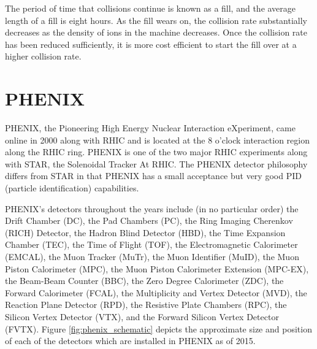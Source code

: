 The period of time that collisions continue is known as a fill, and the average length of a fill is eight hours. As the fill wears on, the collision rate substantially decreases as the density of ions in the machine decreases. Once the collision rate has been reduced sufficiently, it is more cost efficient to start the fill over at a higher collision rate.  


\section{PHENIX}
PHENIX, the Pioneering High Energy Nuclear Interaction eXperiment, came online in 2000 along with RHIC and is located at the 8 o'clock interaction region along the RHIC ring. PHENIX is one of the two major RHIC experiments along with STAR, the Solenoidal Tracker At RHIC. The PHENIX detector philosophy differs from STAR in that PHENIX has a small acceptance but very good PID (particle identification) capabilities. 

PHENIX's detectors throughout the years include (in no particular order) the Drift Chamber (DC), the Pad Chambers (PC), the Ring Imaging Cherenkov (RICH) Detector, the Hadron Blind Detector (HBD), the Time Expansion Chamber (TEC), the Time of Flight (TOF), the Electromagnetic Calorimeter (EMCAL), the Muon Tracker (MuTr), the Muon Identifier (MuID), the Muon Piston Calorimeter (MPC), the Muon Piston Calorimeter Extension (MPC-EX), the Beam-Beam Counter (BBC), the Zero Degree Calorimeter (ZDC), the Forward Calorimeter (FCAL), the Multiplicity and Vertex Detector (MVD), the Reaction Plane Detector (RPD), the Resistive Plate Chambers (RPC), the Silicon Vertex Detector (VTX), and the Forward Silicon Vertex Detector (FVTX). Figure \ref{fig:phenix_schematic} depicts the approximate size and position of each of the detectors which are installed in PHENIX as of 2015.

